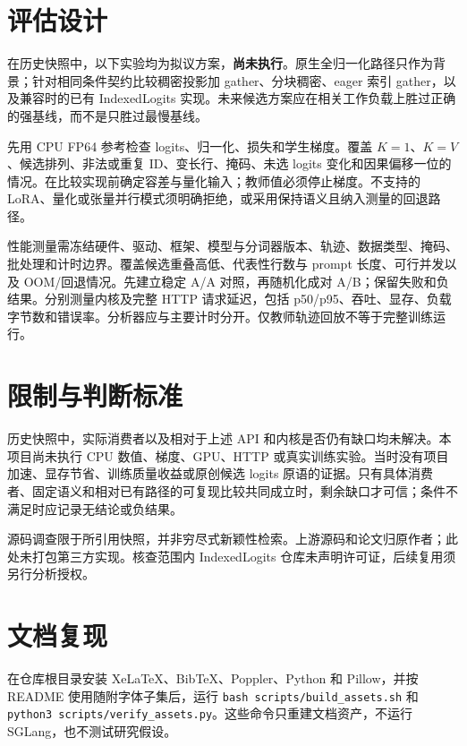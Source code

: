 \documentclass[11pt,a4paper]{article}
\newcommand{\code}[1]{{\small\nolinkurl{#1}}}
\begin{document}
\section{评估设计}
在历史快照中，以下实验均为拟议方案，\textbf{尚未执行}。原生全归一化路径只作为背景；针对相同条件契约比较稠密投影加 gather、分块稠密、eager 索引 gather，以及兼容时的已有 IndexedLogits 实现。未来候选方案应在相关工作负载上胜过正确的强基线，而不是只胜过最慢基线。

先用 CPU FP64 参考检查 logits、归一化、损失和学生梯度。覆盖 $K=1$、$K=V$、候选排列、非法或重复 ID、变长行、掩码、未选 logits 变化和因果偏移一位的情况。在比较实现前确定容差与量化输入；教师值必须停止梯度。不支持的 LoRA、量化或张量并行模式须明确拒绝，或采用保持语义且纳入测量的回退路径。

性能测量需冻结硬件、驱动、框架、模型与分词器版本、轨迹、数据类型、掩码、批处理和计时边界。覆盖候选重叠高低、代表性行数与 prompt 长度、可行并发以及 OOM/回退情况。先建立稳定 A/A 对照，再随机化成对 A/B；保留失败和负结果。分别测量内核及完整 HTTP 请求延迟，包括 p50/p95、吞吐、显存、负载字节数和错误率。分析器应与主要计时分开。仅教师轨迹回放不等于完整训练运行。
\section{限制与判断标准}
历史快照中，实际消费者以及相对于上述 API 和内核是否仍有缺口均未解决。本项目尚未执行 CPU 数值、梯度、GPU、HTTP 或真实训练实验。当时没有项目加速、显存节省、训练质量收益或原创候选 logits 原语的证据。只有具体消费者、固定语义和相对已有路径的可复现比较共同成立时，剩余缺口才可信；条件不满足时应记录无结论或负结果。

源码调查限于所引用快照，并非穷尽式新颖性检索。上游源码和论文归原作者；此处未打包第三方实现。核查范围内 IndexedLogits 仓库未声明许可证，后续复用须另行分析授权。
\section{文档复现}
在仓库根目录安装 XeLaTeX、BibTeX、Poppler、Python 和 Pillow，并按 README 使用随附字体子集后，运行 \code{bash scripts/build_assets.sh} 和 \code{python3 scripts/verify_assets.py}。这些命令只重建文档资产，不运行 SGLang，也不测试研究假设。
\setlength{\bibsep}{0pt}


\end{document}
